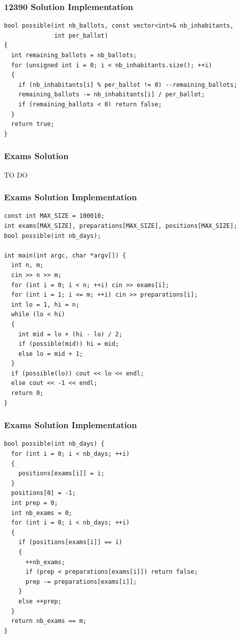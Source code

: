 \documentclass{beamer}
\newcommand{\codeforceslink}[2]{CodeForces (http://www.codeforces.com)
  problem: \href{#2}{\textcolor{blue}{#1}.}}
\newcounter{exo}
\newcommand{\exo}{
  \addtocounter{exo}{1}
  Exercice \arabic{exo}
}
\begin{document}
\begin{frame}[containsverbatim]
\frametitle{12390 Solution Implementation}
\scriptsize

\begin{lstlisting}[mathescape]
bool possible(int nb_ballots, const vector<int>& nb_inhabitants,
              int per_ballot)
{
  int remaining_ballots = nb_ballots;
  for (unsigned int i = 0; i < nb_inhabitants.size(); ++i)
  {
    if (nb_inhabitants[i] % per_ballot != 0) --remaining_ballots;
    remaining_ballots -= nb_inhabitants[i] / per_ballot;
    if (remaining_ballots < 0) return false;
  }
  return true;
}
\end{lstlisting}

\end{frame}

\fi


\ifanswers

\begin{frame}%
\frametitle{Exams Solution}

TO DO

\end{frame}

\begin{frame}[containsverbatim]
\frametitle{Exams Solution Implementation}
\scriptsize

\begin{lstlisting}[mathescape]
const int MAX_SIZE = 100010;
int exams[MAX_SIZE], preparations[MAX_SIZE], positions[MAX_SIZE];
bool possible(int nb_days);

int main(int argc, char *argv[]) {
  int n, m;
  cin >> n >> m;
  for (int i = 0; i < n; ++i) cin >> exams[i];
  for (int i = 1; i <= m; ++i) cin >> preparations[i];
  int lo = 1, hi = n;
  while (lo < hi)
  {
    int mid = lo + (hi - lo) / 2;
    if (possible(mid)) hi = mid;
    else lo = mid + 1;
  }
  if (possible(lo)) cout << lo << endl;
  else cout << -1 << endl;
  return 0;
}
\end{lstlisting}

\end{frame}

\begin{frame}[containsverbatim]
\frametitle{Exams Solution Implementation}
\scriptsize

\begin{lstlisting}[mathescape]
bool possible(int nb_days) {
  for (int i = 0; i < nb_days; ++i)
  {
    positions[exams[i]] = i;
  }
  positions[0] = -1;
  int prep = 0;
  int nb_exams = 0;
  for (int i = 0; i < nb_days; ++i)
  {
    if (positions[exams[i]] == i)
    {
      ++nb_exams;
      if (prep < preparations[exams[i]]) return false;
      prep -= preparations[exams[i]];
    }
    else ++prep;
  }
  return nb_exams == m;
}
\end{lstlisting}

\end{frame}
\end{document}
